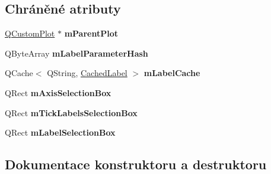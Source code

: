 \subsection*{Chráněné atributy}
\begin{DoxyCompactItemize}
\item 
\hypertarget{classQCPAxisPainterPrivate_a882029a5f2d4abd71289d415c9b90a28}{}\hyperlink{classQCustomPlot}{Q\+Custom\+Plot} $\ast$ {\bfseries m\+Parent\+Plot}\label{classQCPAxisPainterPrivate_a882029a5f2d4abd71289d415c9b90a28}

\item 
\hypertarget{classQCPAxisPainterPrivate_aab8be59df22ed4e43e3a6d511cbc466a}{}Q\+Byte\+Array {\bfseries m\+Label\+Parameter\+Hash}\label{classQCPAxisPainterPrivate_aab8be59df22ed4e43e3a6d511cbc466a}

\item 
\hypertarget{classQCPAxisPainterPrivate_a07ac270ea0c0ae084debd48d6a740e35}{}Q\+Cache$<$ Q\+String, \hyperlink{structQCPAxisPainterPrivate_1_1CachedLabel}{Cached\+Label} $>$ {\bfseries m\+Label\+Cache}\label{classQCPAxisPainterPrivate_a07ac270ea0c0ae084debd48d6a740e35}

\item 
\hypertarget{classQCPAxisPainterPrivate_a9d7586f4923994488bdd006415b13f5f}{}Q\+Rect {\bfseries m\+Axis\+Selection\+Box}\label{classQCPAxisPainterPrivate_a9d7586f4923994488bdd006415b13f5f}

\item 
\hypertarget{classQCPAxisPainterPrivate_a0adaf5f1d89be0f32dc4a904d157e5a9}{}Q\+Rect {\bfseries m\+Tick\+Labels\+Selection\+Box}\label{classQCPAxisPainterPrivate_a0adaf5f1d89be0f32dc4a904d157e5a9}

\item 
\hypertarget{classQCPAxisPainterPrivate_abac9a47048d537f72ca147b6f29d30f1}{}Q\+Rect {\bfseries m\+Label\+Selection\+Box}\label{classQCPAxisPainterPrivate_abac9a47048d537f72ca147b6f29d30f1}

\end{DoxyCompactItemize}


\subsection{Dokumentace konstruktoru a destruktoru}
\hypertarget{classQCPAxisPainterPrivate_a0f14aa5c4aa83dbcd68984a7c73bf94f}{}
